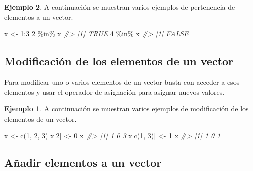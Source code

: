 \documentclass[
]{book}
\newenvironment{Shaded}{\begin{snugshade}}{\end{snugshade}}
\newcommand{\CommentTok}[1]{\textcolor[rgb]{0.56,0.35,0.01}{\textit{#1}}}
\newcommand{\DecValTok}[1]{\textcolor[rgb]{0.00,0.00,0.81}{#1}}
\newcommand{\FunctionTok}[1]{\textcolor[rgb]{0.00,0.00,0.00}{#1}}
\newcommand{\NormalTok}[1]{#1}
\newcommand{\OtherTok}[1]{\textcolor[rgb]{0.56,0.35,0.01}{#1}}
\newcommand{\SpecialCharTok}[1]{\textcolor[rgb]{0.00,0.00,0.00}{#1}}
\theoremstyle{definition}
\theoremstyle{definition}
\newtheorem{example}{Ejemplo}[chapter]
\theoremstyle{definition}
\theoremstyle{definition}
\theoremstyle{remark}
\begin{document}
\begin{example}

A continuación se muestran varios ejemplos de pertenencia de elementos a un vector.

\begin{Shaded}
\begin{Highlighting}[]
\NormalTok{x }\OtherTok{\textless{}{-}} \DecValTok{1}\SpecialCharTok{:}\DecValTok{3}
\DecValTok{2} \SpecialCharTok{\%in\%}\NormalTok{ x}
\CommentTok{\#\textgreater{} [1] TRUE}
\DecValTok{4} \SpecialCharTok{\%in\%}\NormalTok{ x}
\CommentTok{\#\textgreater{} [1] FALSE}
\end{Highlighting}
\end{Shaded}

\hypertarget{modificaciuxf3n-de-los-elementos-de-un-vector}{%
\subsection{Modificación de los elementos de un vector}\label{modificaciuxf3n-de-los-elementos-de-un-vector}}

Para modificar uno o varios elementos de un vector basta con acceder a esos elementos y usar el operador de asignación para asignar nuevos valores.

\begin{example}

A continuación se muestran varios ejemplos de modificación de los elementos de un vector.

\begin{Shaded}
\begin{Highlighting}[]
\NormalTok{x }\OtherTok{\textless{}{-}} \FunctionTok{c}\NormalTok{(}\DecValTok{1}\NormalTok{, }\DecValTok{2}\NormalTok{, }\DecValTok{3}\NormalTok{)}
\NormalTok{x[}\DecValTok{2}\NormalTok{] }\OtherTok{\textless{}{-}} \DecValTok{0}
\NormalTok{x}
\CommentTok{\#\textgreater{} [1] 1 0 3}
\NormalTok{x[}\FunctionTok{c}\NormalTok{(}\DecValTok{1}\NormalTok{, }\DecValTok{3}\NormalTok{)] }\OtherTok{\textless{}{-}} \DecValTok{1}
\NormalTok{x}
\CommentTok{\#\textgreater{} [1] 1 0 1}
\end{Highlighting}
\end{Shaded}

\end{example}

\hypertarget{auxf1adir-elementos-a-un-vector}{%
\subsection{Añadir elementos a un vector}\label{auxf1adir-elementos-a-un-vector}}


\end{example}
\end{document}
